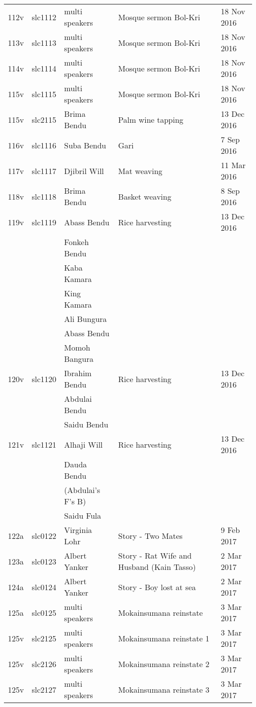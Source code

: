 \begin{xltabular}{\textwidth}{lllQl}
112v & slc1112 & multi speakers & Mosque sermon Bol-Kri & 18 Nov 2016\\
113v & slc1113 & multi speakers & Mosque sermon Bol-Kri & 18 Nov 2016\\
114v & slc1114 & multi speakers & Mosque sermon Bol-Kri & 18 Nov 2016\\
115v & slc1115 & multi speakers & Mosque sermon Bol-Kri & 18 Nov 2016\\
115v & slc2115 & Brima Bendu & Palm wine tapping & 13 Dec 2016\\
116v & slc1116 & Suba Bendu & Gari & 7 Sep 2016\\
117v & slc1117 & Djibril Will & Mat weaving & 11 Mar 2016\\
118v & slc1118 & Brima Bendu & Basket weaving & 8 Sep 2016\\
119v & slc1119 & Abass Bendu & Rice harvesting & 13 Dec 2016\\
& & Fonkeh Bendu & &\\
& & Kaba Kamara & & \\ 
& & King Kamara & & \\ 
& & Ali Bungura & & \\ 
& & Abass Bendu & & \\ 
& & Momoh Bangura & & \\ 
120v & slc1120 & Ibrahim Bendu & Rice harvesting & 13 Dec 2016\\
& & Abdulai Bendu & &\\
& & Saidu Bendu & &\\
121v & slc1121 & Alhaji Will & Rice harvesting & 13 Dec 2016\\
& & Dauda Bendu & &\\
& & (Abdulai's F's B) & &\\
& & Saidu Fula & &\\
122a & slc0122 & Virginia Lohr & Story - Two Mates & 9 Feb 2017\\
123a & slc0123 & Albert Yanker & Story - Rat Wife and Husband (Kain Tasso) & 2 Mar 2017\\
124a & slc0124 & Albert Yanker & Story - Boy lost at sea & 2 Mar 2017\\
125a & slc0125 & multi speakers & Mokainsumana reinstate & 3 Mar 2017\\
125v & slc2125 & multi speakers & Mokainsumana reinstate 1 & 3 Mar 2017\\
125v & slc2126 & multi speakers & Mokainsumana reinstate 2 & 3 Mar 2017\\
125v & slc2127 & multi speakers & Mokainsumana reinstate 3 & 3 Mar 2017\\

\end{xltabular}
